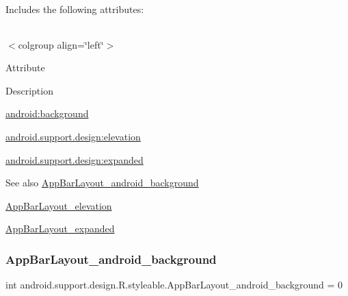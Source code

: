 Includes the following attributes\+:

\tabulinesep=1mm
\begin{longtabu} spread 0pt [c]{*{0}{|X[-1]}|}
\hline
\end{longtabu}
$<$colgroup align=\char`\"{}left\char`\"{}$>$ 

Attribute

Description 

{\ttfamily \hyperlink{classandroid_1_1support_1_1design_1_1R_1_1styleable_a6b21dc33a1ed1fa9304d0eae8bdb7d81}{android\+:background}}

{\ttfamily \hyperlink{classandroid_1_1support_1_1design_1_1R_1_1styleable_a46ec88e27c8abc55f395a719f90aa284}{android.\+support.\+design\+:elevation}}

{\ttfamily \hyperlink{classandroid_1_1support_1_1design_1_1R_1_1styleable_a2a5c8e6f3224750307ec9d99f8d5b551}{android.\+support.\+design\+:expanded}}

\begin{DoxySeeAlso}{See also}
\hyperlink{classandroid_1_1support_1_1design_1_1R_1_1styleable_a6b21dc33a1ed1fa9304d0eae8bdb7d81}{App\+Bar\+Layout\+\_\+android\+\_\+background} 

\hyperlink{classandroid_1_1support_1_1design_1_1R_1_1styleable_a46ec88e27c8abc55f395a719f90aa284}{App\+Bar\+Layout\+\_\+elevation} 

\hyperlink{classandroid_1_1support_1_1design_1_1R_1_1styleable_a2a5c8e6f3224750307ec9d99f8d5b551}{App\+Bar\+Layout\+\_\+expanded} 
\end{DoxySeeAlso}
\mbox{\label{classandroid_1_1support_1_1design_1_1R_1_1styleable_a6b21dc33a1ed1fa9304d0eae8bdb7d81}} 
\subsubsection{\texorpdfstring{App\+Bar\+Layout\+\_\+android\+\_\+background}{AppBarLayout\_android\_background}}
{\footnotesize\ttfamily int android.\+support.\+design.\+R.\+styleable.\+App\+Bar\+Layout\+\_\+android\+\_\+background = 0\hspace{0.3cm}{\ttfamily [static]}}

